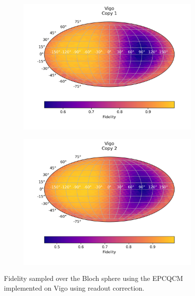 \begin{figure}[H]
  \centering
  \begin{subfigure}{.5\textwidth}
    \centering
    \includegraphics[width=\textwidth]{Figures/Economical/IBM/FullSphere/results_corrected_vigo_copy1.png}
    
    \label{fig:epc_corrected_vigo_sphere_1}
  \end{subfigure}%
  \begin{subfigure}{.5\textwidth}
    \centering
    \includegraphics[width=\textwidth]{Figures/Economical/IBM/FullSphere/results_corrected_vigo_copy2.png}
    
    \label{fig:epc_corrected_vigo_sphere_2}
  \end{subfigure}
  \caption{Fidelity sampled over the Bloch sphere using the EPCQCM implemented on Vigo using readout correction.}
  \label{fig:epc_corrected_vigo_sphere}
\end{figure}

